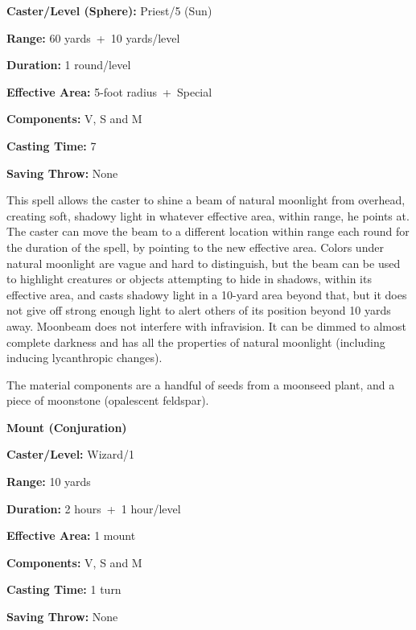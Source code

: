 \begin{multicols}{2}
\begin{minipage}{\columnwidth}
\noindent \textbf{Caster/Level (Sphere):} Priest/5 (Sun)

\noindent \textbf{Range:} 60 yards~+~10 yards/level

\noindent \textbf{Duration:} 1 round/level

\noindent \textbf{Effective Area:} 5-foot radius~+~Special

\noindent \textbf{Components:} V, S and M

\noindent \textbf{Casting Time:} 7

\noindent \textbf{Saving Throw:} None

\end{minipage}

This spell allows the caster to shine a beam of natural moonlight from overhead, creating soft, shadowy light in whatever effective area, within range, he points at.  The caster can move the beam to a different location within range each round for the duration of the spell, by pointing to the new effective area.  Colors under natural moonlight are vague and hard to distinguish, but the beam can be used to highlight creatures or objects attempting to hide in shadows, within its effective area, and casts shadowy light in a 10-yard area beyond that, but it does not give off strong enough light to alert others of its position beyond 10 yards away.  Moonbeam does not interfere with infravision.  It can be dimmed to almost complete darkness and has all the properties of natural moonlight (including inducing lycanthropic changes).  

The material components are a handful of seeds from a moonseed plant, and a piece of moonstone (opalescent feldspar).  

\vspace{1em}

\noindent
\begin{minipage}{\columnwidth}

\noindent \textbf{Mount (Conjuration)}

\noindent \textbf{Caster/Level:} Wizard/1

\noindent \textbf{Range:} 10 yards

\noindent \textbf{Duration:} 2 hours~+~1 hour/level

\noindent \textbf{Effective Area:} 1 mount

\noindent \textbf{Components:} V, S and M

\noindent \textbf{Casting Time:} 1 turn

\noindent \textbf{Saving Throw:} None


\end{minipage}
\end{multicols}
